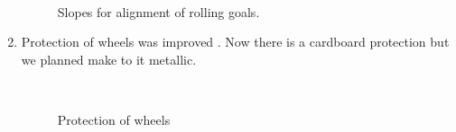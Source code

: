 \begin{enumerate}
	\begin{figure}[H]
		\begin{minipage}[h]{0.2\linewidth}
			\center  
		\end{minipage}
		\begin{minipage}[h]{0.6\linewidth}
			\caption {Slopes for alignment of rolling goals.}
		\end{minipage}
	\end{figure}
	
	\item Protection of wheels was improved . Now there is a cardboard protection but we planned make to it metallic.
	
	\begin{figure}[H]
		\begin{minipage}[h]{0.2\linewidth}
			\center  
		\end{minipage}
		\begin{minipage}[h]{0.6\linewidth}
			\caption{Protection of wheels}
		\end{minipage}
	\end{figure}
	

\end{enumerate}
